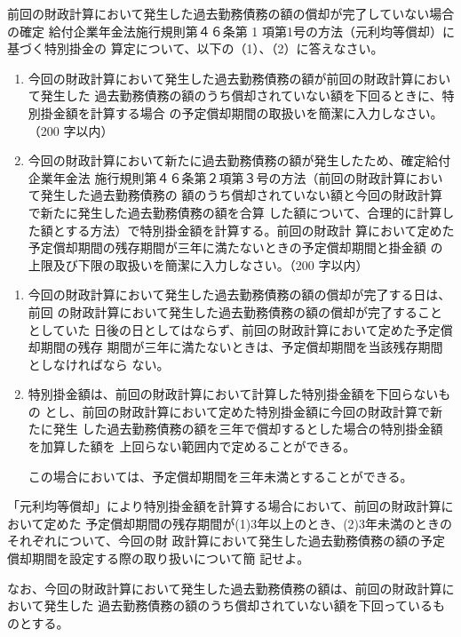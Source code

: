\begin{shortanswer}[年金2 2023 問題2(1)]
  前回の財政計算において発生した過去勤務債務の額の償却が完了していない場合の確定
給付企業年金法施行規則第４６条第 1 項第1号の方法（元利均等償却）に基づく特別掛金の
算定について、以下の（1）、（2）に答えなさい。

\begin{enumerate}[(1)]
  \item 今回の財政計算において発生した過去勤務債務の額が前回の財政計算において発生した
過去勤務債務の額のうち償却されていない額を下回るときに、特別掛金額を計算する場合
の予定償却期間の取扱いを簡潔に入力しなさい。（200 字以内）\\
\item 今回の財政計算において新たに過去勤務債務の額が発生したため、確定給付企業年金法
施行規則第４６条第２項第３号の方法（前回の財政計算において発生した過去勤務債務の
額のうち償却されていない額と今回の財政計算で新たに発生した過去勤務債務の額を合算
した額について、合理的に計算した額とする方法）で特別掛金額を計算する。前回の財政計
算において定めた予定償却期間の残存期間が三年に満たないときの予定償却期間と掛金額
の上限及び下限の取扱いを簡潔に入力しなさい。（200 字以内）
\end{enumerate}
\end{shortanswer}

\begin{answerbox}
  \begin{enumerate}[(1)]
    \item 今回の財政計算において発生した過去勤務債務の額の償却が完了する日は、前回
の財政計算において発生した過去勤務債務の額の償却が完了することとしていた
日後の日としてはならず、前回の財政計算において定めた予定償却期間の残存
期間が三年に満たないときは、予定償却期間を当該残存期間としなければなら
ない。\\
    \item 特別掛金額は、前回の財政計算において計算した特別掛金額を下回らないもの
とし、前回の財政計算において定めた特別掛金額に今回の財政計算で新たに発生
した過去勤務債務の額を三年で償却するとした場合の特別掛金額を加算した額を
上回らない範囲内で定めることができる。

この場合においては、予定償却期間を三年未満とすることができる。
  \end{enumerate}
\end{answerbox}

\begin{shortanswer}[数理人試験 H27 問題3 設問2]
  「元利均等償却」により特別掛金額を計算する場合において、前回の財政計算において定めた
  予定償却期間の残存期間が(1)3年以上のとき、(2)3年未満のときのそれぞれについて、今回の財
  政計算において発生した過去勤務債務の額の予定償却期間を設定する際の取り扱いについて簡
  記せよ。
  
  なお、今回の財政計算において発生した過去勤務債務の額は、前回の財政計算において発生した
  過去勤務債務の額のうち償却されていない額を下回っているものとする。
\end{shortanswer}

